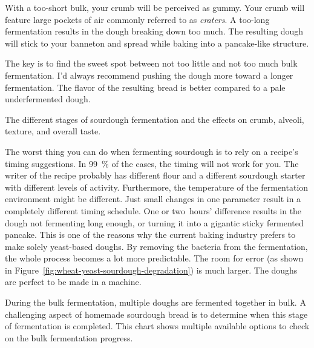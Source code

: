 With a too-short bulk, your crumb will be
perceived as gummy. Your crumb will feature large pockets of
air commonly referred to as \emph{craters}. A too-long fermentation
results in the dough breaking down too much. The resulting
dough will stick to your banneton and spread while baking
into a pancake-like structure.

The key is to find the sweet spot between not too little
and not too much bulk fermentation. I'd always recommend pushing
the dough more toward a longer fermentation. The
flavor of the resulting bread is better compared to a pale
underfermented dough.

\begin{table}[!htb]
    \centering
        
        \caption[Stages of sourdough fermentation]{The different stages of
            sourdough fermentation and the effects on crumb, alveoli, texture,
            and overall taste.}
\end{table}

The worst thing you can do when fermenting sourdough
is to rely on a recipe's timing suggestions. In \qty{99}{\percent}
of the cases, the timing will not work for you. The writer
of the recipe probably has different flour and a different
sourdough starter with different levels of activity. Furthermore,
the temperature of the fermentation environment might be
different. Just small changes in one parameter result
in a completely different timing schedule. One or two~hours'
difference results in the dough not fermenting long enough, or
turning it into a gigantic sticky fermented pancake. This
is one of the reasons why the current baking industry prefers
to make solely yeast-based doughs. By removing the bacteria
from the fermentation, the whole process becomes a lot more
predictable. The room for error (as shown in
Figure~\ref{fig:wheat-yeast-sourdough-degradation}) is much larger. The doughs
are perfect to be made in a machine.

\begin{flowchart}[!htb]
\centering
  
  \caption[Process to check the bulk fermentation]{During the bulk
      fermentation, multiple doughs are fermented together in bulk.  A
      challenging aspect of homemade sourdough bread is to determine when this
      stage of fermentation is completed. This chart shows multiple available
      options to check on the bulk fermentation progress.}%
  \label{fig:bulk-fermentation}
\end{flowchart}

